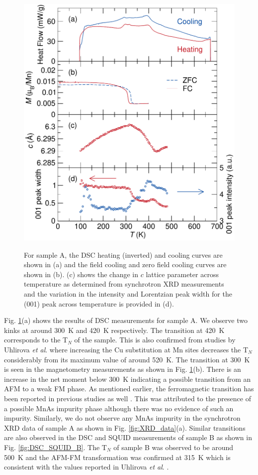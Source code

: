 \documentclass[10pt,doublespacing,edeposit]{uiucthesis2020}
\begin{document}
\begin{mainmatter}
\begin{figure}
\centering\includegraphics[width=0.8\columnwidth]{figures/ch7/sampleA_DSC_squid_11BM_cropped.pdf} \\
\caption{\label{fig:sampleA_transitions}
For sample A, the DSC heating (inverted) and cooling curves are shown in (a) and the field cooling and zero field cooling curves are shown in (b). (c) shows the change in $c$ lattice parameter across temperature as determined from synchrotron XRD measurements and the variation in the intensity and Lorentzian peak width for the (001) peak across temperature is provided in (d).
} 
\end{figure}


Fig. \ref{fig:sampleA_transitions}(a) shows the results of DSC measurements for sample A. We observe two kinks at around 300~K and 420~K respectively. The transition at 420~K corresponds to the T$_N$ of the sample. This is also confirmed from studies by Uhlirova \emph{et al}.\cite{Uhlirova2019} where increasing the Cu substitution at Mn sites decreases the T$_N$ considerably from its maximum value of around 520~K. The transition at 300~K is seen in the magnetometry measurements as shown in Fig. \ref{fig:sampleA_transitions}(b). There is an increase in the net moment below 300~K indicating a possible transition from an AFM to a weak FM phase. As mentioned earlier, the ferromagnetic transition has been reported in previous studies as well \cite{Nateprov2011,Uhlirova2019}. This was attributed to the presence of a possible MnAs impurity phase although there was no evidence of such an impurity. Similarly, we do not observe any MnAs impurity in the synchrotron XRD data of sample A as shown in Fig. \ref{fig:XRD_data}(a). Similar transitions are also observed in the DSC and SQUID measurements of sample B as shown in Fig. \ref{fig:DSC_SQUID_B}. The T$_N$ of sample B was observed to be around 500~K and the AFM-FM transformation was confirmed at 315~K which is consistent with the values reported in Uhlirova \emph{et al}. \cite{Uhlirova2019}.


\end{mainmatter}
\end{document}
